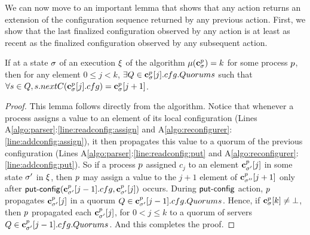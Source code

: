 We can now move to an important lemma that shows that any  action 
returns an extension of the configuration sequence returned by any previous  action. 
First, we show that the last finalized configuration observed by any  action is at least as 
recent as the finalized configuration observed by any subsequent  action. 

\begin{lemma}
	\label{lem:config:propagation}
	If at a state $\sigma$ of an execution $\EX$ of the algorithm $\mu(\mathbf{c}^{p}_{\sigma}) = k$ %
	for some process $p$, then for any element $0\leq j < k$, $\exists Q\in \mathbf{c}^{p}_{\sigma}[j].cfg.Quorums$
	such that $\forall s\in Q, s.nextC(\mathbf{c}^{p}_{\sigma}[j].cfg)= \mathbf{c}^{p}_{\sigma}[j+1]$. 
\end{lemma}
\begin{proof}
	This lemma follows directly from the algorithm. Notice that whenever a process assigns a value to 
	an element of its local configuration (Lines  A\ref{algo:parser}:\ref{line:readconfig:assign} and 
	A\ref{algo:reconfigurer}:\ref{line:addconfig:assign}), it then propagates this value to a quorum of the 
	previous configuration (Lines  A\ref{algo:parser}:\ref{line:readconfig:put} and 
	A\ref{algo:reconfigurer}:\ref{line:addconfig:put}). So if a process $p$ assigned $c_j$ to an 
	element $\mathbf{c}^{p}_{\sigma'}[j]$ in some state $\sigma'$ in $\EX$, then $p$ may assign a value 
	to the $j+1$ element of $\mathbf{c}^{p}_{\sigma''}[j+1]$ only after $\act{put-config}(\config{\cvec{\pr}{\st'}[j-1]},\cvec{\pr}{\st'}[j])$
	occurs. During $\act{put-config}$ action, $p$ propagates $\mathbf{c}^{p}_{\sigma'}[j]$ in a quorum 
	$Q\in\mathbf{c}^{p}_{\sigma'}[j-1].cfg.Quorums$. Hence, if $\mathbf{c}^{p}_{\sigma}[k]\neq\bot$, then $p$ 
	propagated each $\mathbf{c}^{p}_{\sigma'}[j]$, for $0<j\leq k$ to a quorum of servers $Q\in\mathbf{c}^{p}_{\sigma'}[j-1].cfg.Quorums$.
	And this completes the proof. 
%	
\end{proof}



